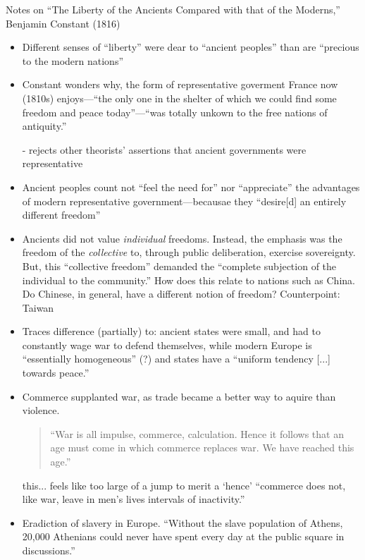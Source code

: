 \documentclass[11pt]{article}
\newcommand{\aside}[1]{{\color{Goldenrod}#1}}
\newcommand{\comment}[1]{{\color{Cerulean}#1}}
\begin{document}
Notes on ``The Liberty of the Ancients Compared with that of the 
Moderns,'' Benjamin Constant (1816)

\begin{itemize}

\item Different senses of ``liberty'' were dear to ``ancient peoples''
than are ``precious to the modern nations''

\item  Constant wonders why, the form of representative goverment France 
now (1810s) enjoys---``the only one in the shelter of which we could
find some freedom and peace today''---``was totally unkown to
the free nations of antiquity.''

    - rejects other theorists' assertions that ancient governments 
    were representative

\item Ancient peoples count not ``feel the need for'' nor ``appreciate''
the advantages of modern representative government---becausae they
``desire[d] an entirely different freedom''

\item Ancients did not value \textsl{individual} freedoms. 
Instead, the emphasis was the freedom of the \textsl{collective} to,
through public deliberation, exercise sovereignty. But, this
``collective freedom'' demanded the ``complete subjection of the 
individual to the community.''
\aside{How does this relate to nations such as China. Do Chinese, in general,
have a different notion of freedom? Counterpoint: Taiwan}

\item Traces difference (partially) to: ancient states were small, and
had to constantly wage war to defend themselves, while modern Europe
is ``essentially homogeneous'' (?) and states 
have a ``uniform tendency [...] towards peace.''

\item Commerce supplanted war, as trade became a better way to aquire 
than violence. 
\begin{quote}
    ``War is all impulse, commerce, calculation. Hence it follows
    that an age must come in which commerce replaces war. We have 
    reached this age.''
\end{quote}
\comment{this... feels like too large of a jump to merit a `hence'}
``commerce does not, like war, leave in men's lives
intervals of inactivity.''

\item Eradiction of slavery in Europe. ``Without the slave 
population of Athens, 20,000 Athenians could never have
spent every day at the public square in discussions.''


\end{itemize}
\end{document}
